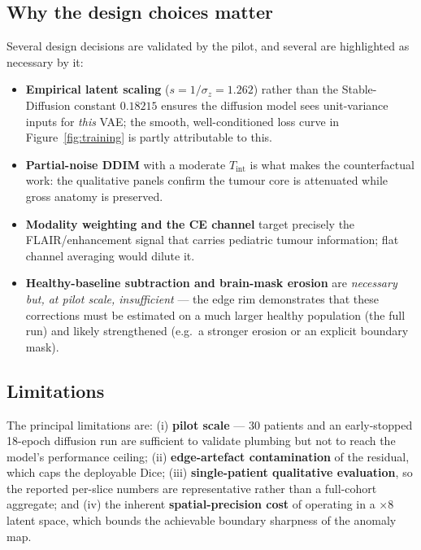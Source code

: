 \documentclass[12pt, a4paper]{article}
\begin{document}
\subsection{Why the design choices matter}
Several design decisions are validated by the pilot, and several are highlighted as necessary by it:
\begin{itemize}
    \item \textbf{Empirical latent scaling} ($s = 1/\sigma_z = 1.262$) rather than the Stable-Diffusion constant $0.18215$ ensures the diffusion model sees unit-variance inputs for \emph{this} VAE; the smooth, well-conditioned loss curve in Figure~\ref{fig:training} is partly attributable to this.
    \item \textbf{Partial-noise DDIM} with a moderate $T_{\text{int}}$ is what makes the counterfactual work: the qualitative panels confirm the tumour core is attenuated while gross anatomy is preserved.
    \item \textbf{Modality weighting and the CE channel} target precisely the FLAIR/enhancement signal that carries pediatric tumour information; flat channel averaging would dilute it.
    \item \textbf{Healthy-baseline subtraction and brain-mask erosion} are \emph{necessary but, at pilot scale, insufficient} — the edge rim demonstrates that these corrections must be estimated on a much larger healthy population (the full run) and likely strengthened (e.g.\ a stronger erosion or an explicit boundary mask).
\end{itemize}

\subsection{Limitations}
The principal limitations are: (i) \textbf{pilot scale} — 30 patients and an early-stopped 18-epoch diffusion run are sufficient to validate plumbing but not to reach the model's performance ceiling; (ii) \textbf{edge-artefact contamination} of the residual, which caps the deployable Dice; (iii) \textbf{single-patient qualitative evaluation}, so the reported per-slice numbers are representative rather than a full-cohort aggregate; and (iv) the inherent \textbf{spatial-precision cost} of operating in a $\times 8$ latent space, which bounds the achievable boundary sharpness of the anomaly map.
\end{document}
